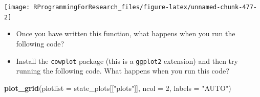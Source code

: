 \documentclass[]{book}
\makeatletter
\newenvironment{Shaded}{\begin{snugshade}}{\end{snugshade}}
\newcommand{\KeywordTok}[1]{\textcolor[rgb]{0.13,0.29,0.53}{\textbf{#1}}}
\newcommand{\DataTypeTok}[1]{\textcolor[rgb]{0.13,0.29,0.53}{#1}}
\newcommand{\DecValTok}[1]{\textcolor[rgb]{0.00,0.00,0.81}{#1}}
\newcommand{\StringTok}[1]{\textcolor[rgb]{0.31,0.60,0.02}{#1}}
\newcommand{\OperatorTok}[1]{\textcolor[rgb]{0.81,0.36,0.00}{\textbf{#1}}}
\newcommand{\NormalTok}[1]{#1}
\providecommand{\tightlist}{%
  \setlength{\itemsep}{0pt}\setlength{\parskip}{0pt}}
\newenvironment{kframe}{%
\medskip{}
\setlength{\fboxsep}{.8em}
 \def\at@end@of@kframe{}%
 \ifinner\ifhmode%
  \def\at@end@of@kframe{\end{minipage}}%
  \begin{minipage}{\columnwidth}%
 \fi\fi%
 \def\FrameCommand##1{\hskip\@totalleftmargin \hskip-\fboxsep
 \colorbox{shadecolor}{##1}\hskip-\fboxsep
     \hskip-\linewidth \hskip-\@totalleftmargin \hskip\columnwidth}%
 \MakeFramed {\advance\hsize-\width
   \@totalleftmargin\z@ \linewidth\hsize
   \@setminipage}}%
 {\par\unskip\endMakeFramed%
 \at@end@of@kframe}
\renewenvironment{Shaded}{\begin{kframe}}{\end{kframe}}
\theoremstyle{definition}
\theoremstyle{definition}
\theoremstyle{definition}
\theoremstyle{remark}
\makeatother
\begin{document}
\begin{center}\texttt{[image: RProgrammingForResearch\_files/figure-latex/unnamed-chunk-477-2]} \end{center}

\begin{itemize}
\tightlist
\item
  Once you have written this function, what happens when you run the
  following code?
\end{itemize}

\begin{Shaded}
\end{Shaded}

\begin{itemize}
\tightlist
\item
  Install the \texttt{cowplot} package (this is a \texttt{ggplot2}
  extension) and then try running the following code. What happens when
  you run this code?
\end{itemize}

\begin{Shaded}
\begin{Highlighting}[]
\KeywordTok{plot_grid}\NormalTok{(}\DataTypeTok{plotlist =}\NormalTok{ state_plots[[}\StringTok{"plots"}\NormalTok{]], }
          \DataTypeTok{ncol =} \DecValTok{2}\NormalTok{, }\DataTypeTok{labels =} \StringTok{"AUTO"}\NormalTok{)}
\end{Highlighting}
\end{Shaded}
\end{document}
